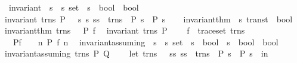 \begin{isabellebody}
\isanewline
{}\isamarkupfalse%
\ invariant\ {\isacharcolon}{\isacharcolon}\ {\isachardoublequoteopen}{\isacharparenleft}{\isacharprime}s\ {\isacharasterisk}\ {\isacharprime}s{\isacharparenright}\ set\ {\isasymRightarrow}\ {\isacharparenleft}{\isacharprime}s\ {\isasymRightarrow}\ bool{\isacharparenright}\ {\isasymRightarrow}\ bool{\isachardoublequoteclose}\ \isanewline
{\isachardoublequoteopen}invariant\ trns\ P\ {\isacharequal}\ {\isacharparenleft}{\isacharbang}\ s\ s{\isacharprime}{\isachardot}\ {\isacharparenleft}s{\isacharcomma}s{\isacharprime}{\isacharparenright}\ {\isacharcolon}\ trns\ {\isasymlongrightarrow}\ P\ s\ {\isasymlongrightarrow}\ P\ s{\isacharprime}{\isacharparenright}{\isachardoublequoteclose}\isanewline
\isanewline
\ \ \isanewline
{}\isamarkupfalse%
\ invariant{\isacharunderscore}thm\ {\isacharcolon}{\isacharcolon}\ {\isachardoublequoteopen}{\isacharprime}s\ trans{\isacharunderscore}t\ {\isasymRightarrow}\ bool{\isachardoublequoteclose}\ \isanewline
{\isachardoublequoteopen}invariant{\isacharunderscore}thm\ trns\ {\isacharequal}\ {\isacharparenleft}{\isacharbang}\ P\ f{\isachardot}\isanewline
\ \ invariant\ trns\ P\ {\isacharampersand}\ \isanewline
\ \ f\ {\isacharcolon}\ trace{\isacharunderscore}set\ trns\ {\isacharampersand}\isanewline
\ \ P{\isacharparenleft}f\ {}{\isacharparenright}\ {\isasymlongrightarrow}\ {\isacharparenleft}{\isacharbang}\ n{\isachardot}\ P\ {\isacharparenleft}f\ n{\isacharparenright}{\isacharparenright}\ \isanewline
{\isacharparenright}{\isachardoublequoteclose}\isanewline
\isanewline
\isanewline
\isanewline
{}\isamarkupfalse%
\ invariant{\isacharunderscore}assuming\ {\isacharcolon}{\isacharcolon}\ {\isachardoublequoteopen}{\isacharparenleft}{\isacharprime}s\ {\isacharasterisk}\ {\isacharprime}s{\isacharparenright}\ set\ {\isasymRightarrow}\ {\isacharparenleft}{\isacharprime}s\ {\isasymRightarrow}\ bool{\isacharparenright}\ {\isasymRightarrow}\ {\isacharparenleft}{\isacharprime}s\ {\isasymRightarrow}\ bool{\isacharparenright}\ {\isasymRightarrow}\ bool{\isachardoublequoteclose}\ \isanewline
{\isachardoublequoteopen}invariant{\isacharunderscore}assuming\ trns\ P\ Q\ {\isacharequal}\ {\isacharparenleft}\isanewline
\ \ let\ trns\ {\isacharequal}\ {\isacharbraceleft}\ {\isacharparenleft}s{\isacharcomma}s{\isacharprime}{\isacharparenright}{\isachardot}\ {\isacharparenleft}s{\isacharcomma}s{\isacharprime}{\isacharparenright}\ {\isacharcolon}\ trns\ {\isacharampersand}\ P\ s\ {\isacharampersand}\ P\ s{\isacharprime}\ {\isacharbraceright}\ in\isanewline

\end{isabellebody}
